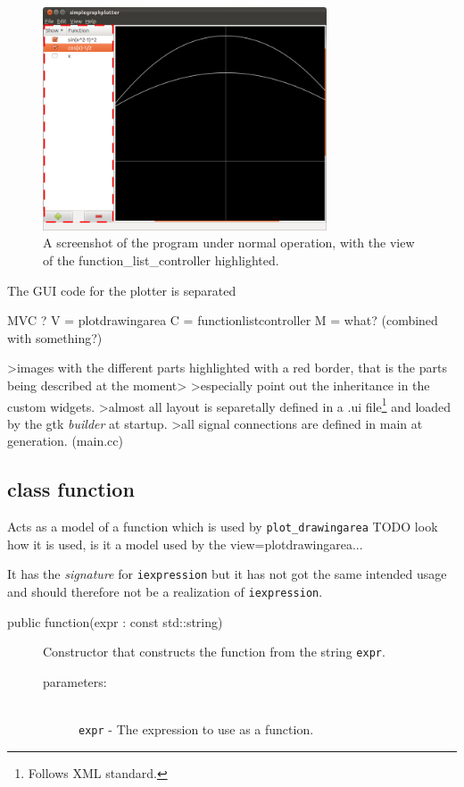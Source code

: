 \documentclass[a4paper,11pt]{kth-mag}
\begin{document}
\begin{figure}[ht]
\begin{center}
    \includegraphics[width=0.75\textwidth]{screenshot00_function_list_controller.png}
    \caption{\small{A screenshot of the program under normal operation, with
    the view of the function\_list\_controller highlighted.}}
   \label{fig:screenshotfunctionlistcontroller}
\end{center}
\end{figure}


The GUI code for the plotter is separated 

MVC ?
V = plotdrawingarea
C = functionlistcontroller
M = what? (combined with something?)

>images with the different parts highlighted with a red border, that is the parts being described at the moment>
>especially point out the inheritance in the custom widgets.
>almost all layout is separetally defined in a .ui file\footnote{Follows XML
standard.} and loaded by the gtk \emph{builder} at startup.
>all signal connections are defined in main at generation. (main.cc)


\subsection{class function}
Acts as a model of a function which is used by \texttt{plot\_drawingarea}
TODO look how it is used, is it a model used by the view=plotdrawingarea...

It has the \emph{signature} for \texttt{iexpression} but it has not got the
same intended usage and should therefore not be a realization of
\texttt{iexpression}.

\begin{description}
    \item[public function(expr : const std::string)] Constructor 
    that constructs the function from the string \texttt{expr}.
    \begin{description}
        \item[parameters:]~\\
            \verb+expr+ - The expression to use as a function.
    \end{description}
\end{description}
\end{document}
